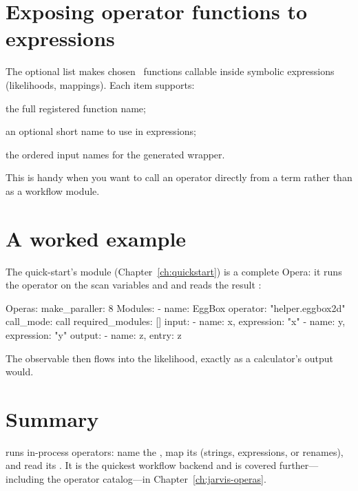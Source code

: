 \section{Exposing operator functions to expressions}
\label{sec:op-functions}

The optional  list makes chosen \Operas\ functions callable inside symbolic
expressions (likelihoods, mappings). Each item supports:

\begin{description}[style=nextline, leftmargin=1.2em]
  \item[\yamlkey{name}] the full registered function name;
  \item[\yamlkey{alias}] an optional short name to use in expressions;
  \item[\yamlkey{inputs}] the ordered input names for the generated wrapper.
\end{description}

\noindent This is handy when you want to call an operator directly from a 
term rather than as a workflow module.

\section{A worked example}
\label{sec:op-example}

The quick-start's  module (Chapter~\ref{ch:quickstart}) is a complete Opera: it runs
the operator  on the scan variables  and  and reads
the result :

\begin{yamlwin}
Operas:
  make_paraller: 8
  Modules:
    - name: EggBox
      operator: "helper.eggbox2d"
      call_mode: call
      required_modules: []
      input:
        - {name: x, expression: "x"}
        - {name: y, expression: "y"}
      output:
        - {name: z, entry: z}
\end{yamlwin}

\noindent The observable  then flows into the likelihood, exactly as a calculator's
output would.

\section{Summary}
\label{sec:op-summary}

 runs in-process operators: name the , map its 
(strings, expressions, or renames), and read its . It is the quickest workflow
backend and is covered further---including the operator catalog---in
Chapter~\ref{ch:jarvis-operas}.
